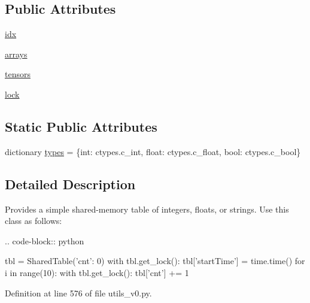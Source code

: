 \subsection*{Public Attributes}
\begin{DoxyCompactItemize}
\item 
\hyperlink{classparlai_1_1agents_1_1legacy__agents_1_1seq2seq_1_1utils__v0_1_1SharedTable_ae28772f48b62430475ee87a0e0165297}{idx}
\item 
\hyperlink{classparlai_1_1agents_1_1legacy__agents_1_1seq2seq_1_1utils__v0_1_1SharedTable_a85e95ce5ffe060084b0aac12e09eb04d}{arrays}
\item 
\hyperlink{classparlai_1_1agents_1_1legacy__agents_1_1seq2seq_1_1utils__v0_1_1SharedTable_a10fd3cbec22c17f5e522d7813f3d3056}{tensors}
\item 
\hyperlink{classparlai_1_1agents_1_1legacy__agents_1_1seq2seq_1_1utils__v0_1_1SharedTable_acd92e05b572beb74c384c3c6b833dac6}{lock}
\end{DoxyCompactItemize}
\subsection*{Static Public Attributes}
\begin{DoxyCompactItemize}
\item 
dictionary \hyperlink{classparlai_1_1agents_1_1legacy__agents_1_1seq2seq_1_1utils__v0_1_1SharedTable_ac7e68f60287f180ffacb892540d737b8}{types} = \{int\+: ctypes.\+c\+\_\+int, float\+: ctypes.\+c\+\_\+float, bool\+: ctypes.\+c\+\_\+bool\}
\end{DoxyCompactItemize}


\subsection{Detailed Description}
\begin{DoxyVerb}Provides a simple shared-memory table of integers, floats, or strings.
Use this class as follows:

.. code-block:: python

    tbl = SharedTable({'cnt': 0})
    with tbl.get_lock():
        tbl['startTime'] = time.time()
    for i in range(10):
        with tbl.get_lock():
            tbl['cnt'] += 1
\end{DoxyVerb}
 

Definition at line 576 of file utils\+\_\+v0.\+py.



